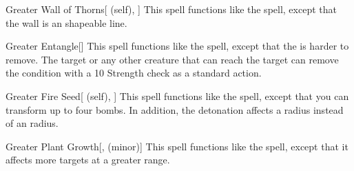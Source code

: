 \lowercase{\hypertarget{spell:Greater Wall of Thorns}{}}\label{spell:Greater Wall of Thorns}
\begin{attuneability}[Rank 4]{\hypertarget{spell:Greater Wall of Thorns}{Greater Wall of Thorns}}[ (self), ]
This spell functions like the  spell, except that the wall is an \arealarge shapeable line.
\end{attuneability}
\vspace{0.25em}



\lowercase{\hypertarget{spell:Greater Entangle}{}}\label{spell:Greater Entangle}
\begin{freeability}[Rank 5]{\hypertarget{spell:Greater Entangle}{Greater Entangle}}[]
This spell functions like the  spell, except that the  is harder to remove.
The target or any other creature that can reach the target can remove the condition with a  10 Strength check as a standard action.
\end{freeability}
\vspace{0.25em}



\lowercase{\hypertarget{spell:Greater Fire Seed}{}}\label{spell:Greater Fire Seed}
\begin{attuneability}[Rank 5]{\hypertarget{spell:Greater Fire Seed}{Greater Fire Seed}}[ (self), ]
This spell functions like the  spell, except that you can transform up to four bombs.
In addition, the detonation affects a \areamed radius instead of an \areasmall radius.
\end{attuneability}
\vspace{0.25em}



\lowercase{\hypertarget{spell:Greater Plant Growth}{}}\label{spell:Greater Plant Growth}
\begin{freeability}[Rank 6]{\hypertarget{spell:Greater Plant Growth}{Greater Plant Growth}}[,  (minor)]
This spell functions like the  spell, except that it affects more targets at a greater range.
\end{freeability}
\vspace{0.25em}



